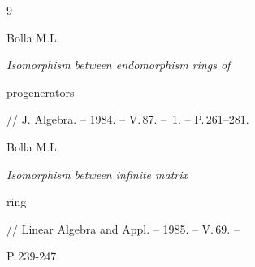 \begin{thebibliography}{9}


Bolla M.L. {\em Isomorphism between endomorphism rings of


progenerators} // J. Algebra. -- 1984. -- V.\,87. -- \No\,1. -- P.\,261--281.







Bolla M.L. {\em Isomorphism between infinite matrix


ring } // Linear Algebra and Appl. -- 1985. -- V.\,69. --


P.\,239-247.





\end{thebibliography}





\vskip 2cm









 








